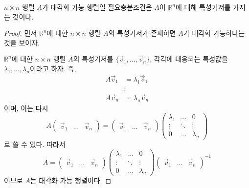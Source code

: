 \documentclass[sections/engineering_mathematics_lecture_note.tex]{subfiles}
\begin{document}
\begin{theorem}
    $n \times n$ 행렬 $A$가 대각화 가능 행렬일 필요충분조건은 $A$이 $\mathbb R^n$에 대해 특성기저를 가지는 것이다.
\end{theorem}

\begin{proof}
    먼저 $\mathbb R^n$에 대한 $n \times n$ 행렬 $A$의 특성기저가 존재하면 $A$가 대각화 가능하다는 것을 보이자.

    $\mathbb R^n$에 대한 $n \times n$ 행렬 $A$의 특성기저를 $\{\vec v_1, \dots, \vec v_n\}$, 각각에 대응되는 특성값을 $\lambda_1, \dots, \lambda_n$이라고 하자.
    즉,
    \begin{align*}
        A\vec v_1 &= \lambda_1 \vec v_1\\
                  &\vdots\\
        A\vec v_n &= \lambda_n \vec v_n
    \end{align*}
    이며, 이는 다시
    \begin{equation*}
        A
        \begin{pmatrix}
            \vec v_1 & \dots & \vec v_n
        \end{pmatrix}
        =
        \begin{pmatrix}
            \vec v_1 & \dots & \vec v_n
        \end{pmatrix}
        \begin{pmatrix}
            \lambda_1 & \dots & 0\\
            \vdots & \ddots & \vdots\\
            0 & \dots & \lambda_n
        \end{pmatrix}
    \end{equation*}
    로 쓸 수 있다.
    따라서
    \begin{equation*}
        A
        =
        \begin{pmatrix}
            \vec v_1 & \dots & \vec v_n
        \end{pmatrix}
        \begin{pmatrix}
            \lambda_1 & \dots & 0\\
            \vdots & \ddots & \vdots\\
            0 & \dots & \lambda_n
        \end{pmatrix}
        \begin{pmatrix}
            \vec v_1 & \dots & \vec v_n
        \end{pmatrix}^{-1}
    \end{equation*}
    이므로 $A$는 대각화 가능 행렬이다.


\end{proof}
\end{document}
